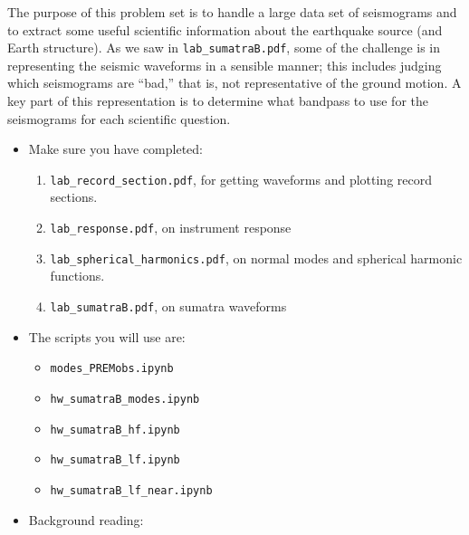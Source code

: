 \documentclass[11pt,titlepage,fleqn]{article}
\newcommand{\tfileprem}{{\tt modes\_PREMobs.ipynb}}
\newcommand{\tfilemodes}{{\tt hw\_sumatraB\_modes.ipynb}}
\newcommand{\tfilelf}{{\tt hw\_sumatraB\_lf.ipynb}}
\newcommand{\tfilehf}{{\tt hw\_sumatraB\_hf.ipynb}}
\newcommand{\tfilelfnear}{{\tt hw\_sumatraB\_lf\_near.ipynb}}
\begin{document}
\begin{spacing}{1.0}

The purpose of this problem set is to handle a large data set of seismograms and to extract some useful scientific information about the earthquake source (and Earth structure). As we saw in \verb+lab_sumatraB.pdf+, some of the challenge is in representing the seismic waveforms in a sensible manner; this includes judging which seismograms are ``bad,'' that is, not representative of the ground motion. A key part of this representation is to determine what bandpass to use for the seismograms for each scientific question.

\begin{itemize}


\item Make sure you have completed:
%
\begin{enumerate}
\item \verb+lab_record_section.pdf+, for getting waveforms and plotting record sections.

\item \verb+lab_response.pdf+, on instrument response

\item \verb+lab_spherical_harmonics.pdf+, on normal modes and spherical harmonic functions.

\item \verb+lab_sumatraB.pdf+, on sumatra waveforms
\end{enumerate}


\item The scripts you will use are:
%
\begin{itemize}
\item \tfileprem\
\item \tfilemodes\
\item \tfilehf\
\item \tfilelf\
\item \tfilelfnear\
\end{itemize}


\item Background reading:


\end{itemize}
\end{spacing}
\end{document}
